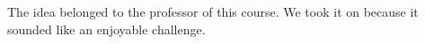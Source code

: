 The idea belonged to the professor of this course. We took it on because it sounded like an enjoyable challenge.